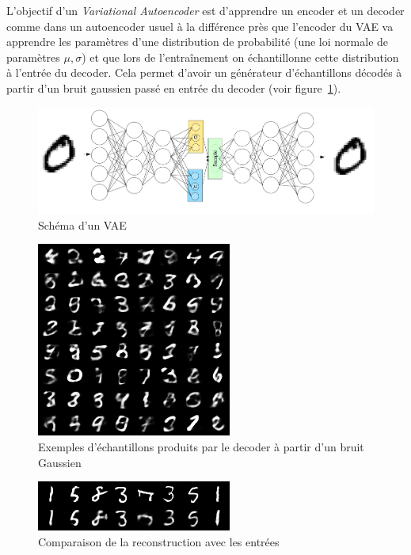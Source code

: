\documentclass{standalone}
\begin{document}
L'objectif d'un \emph{Variational Autoencoder} est d'apprendre un encoder et un decoder comme dans un autoencoder usuel à la différence près que l'encoder du VAE va apprendre les paramètres d'une distribution de probabilité (une loi normale de paramètres $\mu, \sigma$) et que lors de l'entraînement on échantillonne cette distribution à l'entrée du decoder. Cela permet d'avoir un générateur d'échantillons décodés à partir d'un bruit gaussien passé en entrée du decoder (voir figure~\ref{vae:samples}).

\begin{figure}[H]
	\center
	\includegraphics[scale=0.2]{img/vae.png}
	\caption{Schéma d'un VAE}
\end{figure}

\begin{figure}[ht!]
	\center
	\includegraphics[scale=0.5]{img/vae_sample_10.png}
	\caption{Exemples d'échantillons produits par le decoder à partir d'un bruit Gaussien}
	\label{vae:samples}
\end{figure}

\begin{figure}[H]
	\center
	\includegraphics[scale=0.5]{img/vae_reconstruction_10.png}
	\caption{Comparaison de la reconstruction avec les entrées}
	\label{vae:reconst}
\end{figure}



\begin{verbatim}

\end{verbatim}
\end{document}
